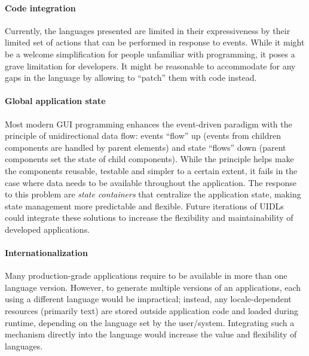\paragraph{Code integration}
Currently, the languages presented are limited in their expressiveness by their limited set of actions that can be performed in response to events.
While it might be a welcome simplification for people unfamiliar with programming, it poses a grave limitation for developers.
It might be reasonable to accommodate for any gaps in the language by allowing to \enquote{patch} them with code instead.


\paragraph{Global application state}
Most modern GUI programming enhances the event-driven paradigm with the principle of unidirectional data flow: events \enquote{flow} up (events from children components are handled by parent elements) and state \enquote{flows} down (parent components set the state of child components).
While the principle helps make the components reusable, testable and simpler to a certain extent, it fails in the case where data needs to be available throughout the application.
The response to this problem are \emph{state containers} that centralize the application state, making state management more predictable and flexible.
Future iterations of UIDLs could integrate these solutions to increase the flexibility and maintainability of developed applications.

\paragraph{Internationalization}
Many production-grade applications require to be available in more than one language version.
However, to generate multiple versions of an applications, each using a different language would be impractical;
instead, any locale-dependent resources (primarily text) are stored outside application code and loaded during runtime, depending on the language set by the user/system.
Integrating such a mechanism directly into the language would increase the value and flexibility of languages.


